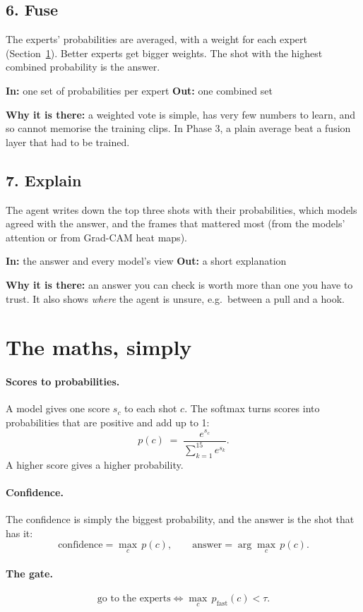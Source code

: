 \documentclass[11pt,a4paper]{article}
\newcommand{\why}[1]{\par\noindent\textbf{Why it is there:} #1}
\newcommand{\inout}[2]{\par\noindent\textbf{In:} #1 \quad
  \textbf{Out:} #2}
\begin{document}
\subsection*{6. Fuse}
The experts' probabilities are averaged, with a weight for each expert
(Section~\ref{sec:maths}). Better experts get bigger weights. The shot
with the highest combined probability is the answer.
\inout{one set of probabilities per expert}{one combined set}
\why{a weighted vote is simple, has very few numbers to learn, and so
cannot memorise the training clips. In Phase 3, a plain average beat a
fusion layer that had to be trained.}

\subsection*{7. Explain}
The agent writes down the top three shots with their probabilities, which
models agreed with the answer, and the frames that mattered most (from the
models' attention or from Grad-CAM heat maps).
\inout{the answer and every model's view}{a short explanation}
\why{an answer you can check is worth more than one you have to trust.
It also shows \emph{where} the agent is unsure, e.g.\ between a pull and
a hook.}

\section{The maths, simply}
\label{sec:maths}

\paragraph{Scores to probabilities.}
A model gives one score $s_c$ to each shot $c$. The softmax turns scores
into probabilities that are positive and add up to 1:
\[
  p(c) \;=\; \frac{e^{s_c}}{\sum_{k=1}^{15} e^{s_k}} .
\]
A higher score gives a higher probability.

\paragraph{Confidence.}
The confidence is simply the biggest probability, and the answer is the
shot that has it:
\[
  \text{confidence} = \max_c \, p(c), \qquad
  \text{answer} = \arg\max_c \, p(c).
\]

\paragraph{The gate.}
\[
  \text{go to the experts} \iff \max_c \, p_{\text{fast}}(c) < \tau .
\]
\end{document}
